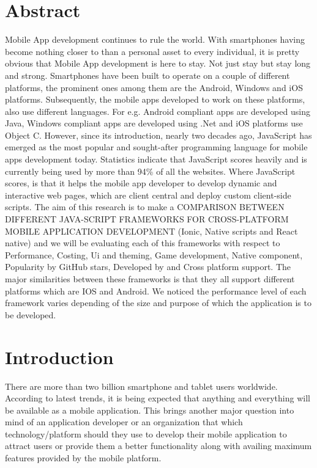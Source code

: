 \documentclass[12pt]{extreport}
\begin{document}
\section*{Abstract}
Mobile App development continues to rule the world. With smartphones having become nothing closer to than a personal asset to every individual, it is pretty obvious that Mobile App development is here to stay. Not just stay but stay long and strong. Smartphones have been built to operate on a couple of different platforms, the prominent ones among them are the Android, Windows and iOS platforms. Subsequently, the mobile apps developed to work on these platforms, also use different languages. For e.g. Android compliant apps are developed using Java, Windows compliant apps are developed using .Net and iOS platforms use Object C.
However, since its introduction, nearly two decades ago, JavaScript has emerged as the most popular and sought-after programming language for mobile apps development today. Statistics indicate that JavaScript scores heavily and is currently being used by more than 94\% of all the websites. Where JavaScript scores, is that it helps the mobile app developer to develop dynamic and interactive web pages, which are client central and deploy custom client-side scripts.
The aim of this research is to make a COMPARISON BETWEEN DIFFERENT JAVA-SCRIPT FRAMEWORKS FOR CROSS-PLATFORM MOBILE APPLICATION DEVELOPMENT (Ionic, Native scripts and React native) and we will be evaluating each of this frameworks with respect to Performance, Costing, Ui and theming, Game development, Native component, Popularity by GitHub stars, Developed by and Cross platform support.
The major similarities between these frameworks is that they all support different platforms which are IOS and Android. We noticed the performance level of each framework varies depending of the size and purpose of which the application is to be developed.\begin{flushleft}
	
\end{flushleft}

\newpage
\section*{Introduction}
There are more than two billion smartphone and tablet users worldwide. According to latest trends, it is being expected that anything and everything will be available as a mobile application. This brings another major question into mind of an application developer or an organization that which technology/platform should they use to develop their mobile application to attract users or provide them a better functionality along with availing maximum features provided by the mobile platform.
\end{document}

